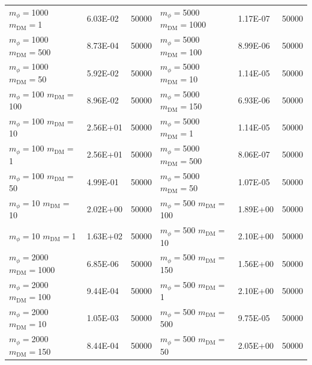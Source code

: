 \begin{table}[]
\begin{tabular}{lll||lll}
$m_\phi=$1000 $m_\textrm{DM}=$1           & 6.03E-02     & 50000                  & $m_\phi=$5000 $m_\textrm{DM}=$1000        & 1.17E-07     & 50000                  \\ 
$m_\phi=$1000 $m_\textrm{DM}=$500         & 8.73E-04     & 50000                  & $m_\phi=$5000 $m_\textrm{DM}=$100         & 8.99E-06     & 50000                  \\ 
$m_\phi=$1000 $m_\textrm{DM}=$50          & 5.92E-02     & 50000                  & $m_\phi=$5000 $m_\textrm{DM}=$10          & 1.14E-05     & 50000                  \\ 
$m_\phi=$100 $m_\textrm{DM}=$100          & 8.96E-02     & 50000                  & $m_\phi=$5000 $m_\textrm{DM}=$150         & 6.93E-06     & 50000                  \\ 
$m_\phi=$100 $m_\textrm{DM}=$10           & 2.56E+01     & 50000                  & $m_\phi=$5000 $m_\textrm{DM}=$1           & 1.14E-05     & 50000                  \\ 
$m_\phi=$100 $m_\textrm{DM}=$1            & 2.56E+01     & 50000                  & $m_\phi=$5000 $m_\textrm{DM}=$500         & 8.06E-07     & 50000                  \\ 
$m_\phi=$100 $m_\textrm{DM}=$50           & 4.99E-01     & 50000                  & $m_\phi=$5000 $m_\textrm{DM}=$50          & 1.07E-05     & 50000                  \\ 
$m_\phi=$10 $m_\textrm{DM}=$10            & 2.02E+00     & 50000                  & $m_\phi=$500 $m_\textrm{DM}=$100          & 1.89E+00     & 50000                  \\ 
$m_\phi=$10 $m_\textrm{DM}=$1             & 1.63E+02     & 50000                  & $m_\phi=$500 $m_\textrm{DM}=$10           & 2.10E+00     & 50000                  \\ 
$m_\phi=$2000 $m_\textrm{DM}=$1000        & 6.85E-06     & 50000                  & $m_\phi=$500 $m_\textrm{DM}=$150          & 1.56E+00     & 50000                  \\ 
$m_\phi=$2000 $m_\textrm{DM}=$100         & 9.44E-04     & 50000                  & $m_\phi=$500 $m_\textrm{DM}=$1            & 2.10E+00     & 50000                  \\ 
$m_\phi=$2000 $m_\textrm{DM}=$10          & 1.05E-03     & 50000                  & $m_\phi=$500 $m_\textrm{DM}=$500          & 9.75E-05     & 50000                  \\ 
$m_\phi=$2000 $m_\textrm{DM}=$150         & 8.44E-04     & 50000                  & $m_\phi=$500 $m_\textrm{DM}=$50           & 2.05E+00     & 50000                  \\ 

\end{tabular}
\end{table}
